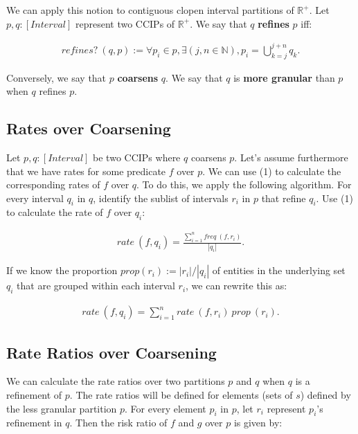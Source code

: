 \documentclass[]{article}
\begin{document}
We can apply this notion to contiguous clopen interval partitions of
\(\mathbb{R}^+\). Let \(p, q : [Interval]\) represent two CCIPs of
\(\mathbb{R}^+\). We say that \(q\) \textbf{refines} \(p\) iff:

\begin{align*}
refines?\ (q, p) := \forall p_i \in p, \exists (j, n \in \mathbb{N}), p_i = \bigcup_{k=j}^{j+n} q_k.
\end{align*}

Conversely, we say that \(p\) \textbf{coarsens} \(q\). We say that \(q\)
is \textbf{more granular} than \(p\) when \(q\) refines \(p\).

\hypertarget{rates-over-coarsening}{%
\subsection{Rates over Coarsening}\label{rates-over-coarsening}}

Let \(p, q : [Interval]\) be two CCIPs where \(q\) coarsens \(p\). Let's
assume furthermore that we have rates for some predicate \(f\) over
\(p\). We can use (1) to calculate the corresponding rates of \(f\) over
\(q\). To do this, we apply the following algorithm. For every interval
\(q_i\) in \(q\), identify the sublist of intervals \(r_i\) in \(p\)
that refine \(q_i\). Use (1) to calculate the rate of \(f\) over
\(q_i\):

\begin{align*}
  rate\ (f, q_i) = \frac{\sum_{i=1}^n freq\ (f, r_i)}{|q_i|}.
\end{align*}

If we know the proportion \(prop (r_i) := |r_i|/|q_i|\) of entities in
the underlying set \(q_i\) that are grouped within each interval
\(r_i\), we can rewrite this as:

\begin{align*}
rate\ (f, q_i) = \sum_{i = 1}^n rate\ (f, r_i)\ prop\ (r_i).
\end{align*}

\hypertarget{rate-ratios-over-coarsening}{%
\subsection{Rate Ratios over
Coarsening}\label{rate-ratios-over-coarsening}}

We can calculate the rate ratios over two partitions \(p\) and \(q\)
when \(q\) is a refinement of \(p\). The rate ratios will be defined for
elements (sets of \(s\)) defined by the less granular partition \(p\).
For every element \(p_i\) in \(p\), let \(r_i\) represent \(p_i\)'s
refinement in \(q\). Then the risk ratio of \(f\) and \(g\) over \(p\)
is given by:
\end{document}

